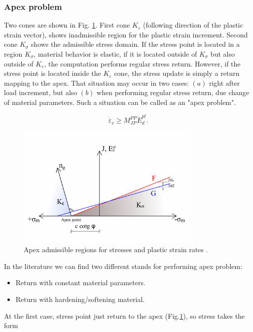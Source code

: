 \subsubsection{Apex problem}
\indent

Two cones are shown in Fig. \ref{obr:apex_cones}. First cone $K_\varepsilon$ (following direction of the plastic strain vector), shows inadmissible region for the plastic strain increment. Second cone $K_\sigma$ shows the admissible stress domain. If the stress point is located in a region $K_\sigma$, material behavior is elastic, if it is located outside of $K_\sigma$ but also outside of $K_\varepsilon$, the computation  performs regular stress return. However, if the stress point is located inside the $K_\varepsilon$ cone, the stress update is simply a return mapping to the apex. That situation may occur in two cases: $(a)$ right after load increment, but also $(b)$ when performing regular stress return, due change of material parameters. Such a situation can be called as an "apex problem". 

\begin{equation}\label{eq:eps_apex}
	\dot{\varepsilon}_v \geq M_{JP}^{PP} \dot{E}_d^{pl}.
\end{equation}


\begin{figure}[h!]
	\centering  
	\includegraphics[width=0.8\textwidth, angle=0]{obrazky/apex_cones_my.png}
	\caption[Apex abmissible regions]{Apex admissible regions for stresses and plastic strain rates \cite{geofem}.} \label{obr:apex_cones}
\end{figure}

In the literature we can find two different stands for performing apex problem:

\begin{itemize}
	\item Return with constant material parameters.
	\item Return with hardening/softening material.
\end{itemize}
At the first case, stress point just return to the apex (Fig.\ref{obr:apex_cones}), so stress takes the form



